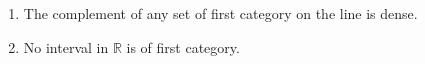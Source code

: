 \begin{enumerate}
  \item The complement of any set of first category on the line is dense.
  \item No interval in $\mathbb{R}$ is of first category.
\end{enumerate}

